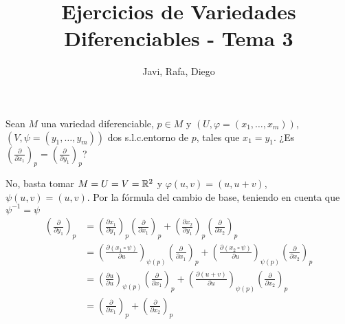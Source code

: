 \documentclass[twoside]{article}
\begin{document}
\title{Ejercicios de Variedades Diferenciables - Tema 3}
\author{Javi, Rafa, Diego}
\maketitle



\begin{ejercicio}{1}\label{1}
Sean $M$ una variedad diferenciable, $p \in M$ y $(U, \varphi = (x_1, \dots , x_m))$, $(V, \psi =
(y_1, \dots , y_m))$ dos s.l.c.entorno de $p$, tales que $x_1 = y_1$. ¿Es $\left(
\frac{\partial}{\partial x_1}\right)_p = \left(\frac{\partial}{\partial y_1}\right)_p$?
\end{ejercicio}
\begin{solucion}
No, basta tomar $M=U=V=\mathbb{R}^2$ y $φ(u,v)=(u,u+v)$, $ψ(u,v)=(u,v)$.
Por la fórmula del cambio de base, teniendo en cuenta que $\psi^{-1}=\psi$
\begin{align*} \left(\frac{\partial}{\partial y_1}\right)_p &= \left(\frac{\partial x_1}{\partial y_1}\right)_p \left(\frac{\partial}{\partial x_1}\right)_p +  \left(\frac{\partial x_2}{\partial y_1}\right)_p  \left(\frac{\partial}{\partial x_2}\right)_p \\
&=\left(\frac{\partial (x_1\circ \psi)}{\partial u}\right)_{\psi(p)} \left(\frac{\partial}{\partial x_1}\right)_p +  \left(\frac{\partial (x_2 \circ \psi)}{\partial u}\right)_{\psi(p)}  \left(\frac{\partial}{\partial x_2}\right)_p\\
&=\left(\frac{\partial u}{\partial u}\right)_{\psi(p)} \left(\frac{\partial}{\partial x_1}\right)_p +  \left(\frac{\partial (u+v)}{\partial u}\right)_{\psi(p)}  \left(\frac{\partial}{\partial x_2}\right)_p\\
&=
 \left(\frac{\partial}{\partial x_1}\right)_p + \left(\frac{\partial}{\partial x_2}\right)_p
\end{align*}
\end{solucion}
\newpage
\end{document}
